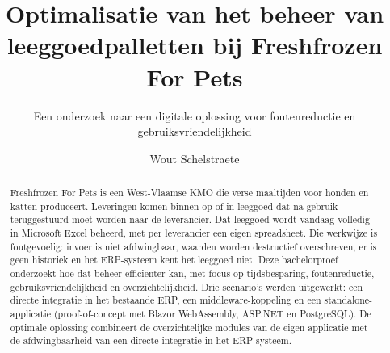 \documentclass[a0,portrait]{hogent-poster}
\title{Optimalisatie van het beheer van leeggoedpalletten bij Freshfrozen For Pets}
\subtitle{Een onderzoek naar een digitale oplossing voor foutenreductie en gebruiksvriendelijkheid}
\author{Wout Schelstraete}
\begin{document}
\maketitle

\begin{abstract}
Freshfrozen For Pets is een West-Vlaamse KMO die verse maaltijden voor honden en katten produceert. Leveringen komen binnen op of in leeggoed dat na gebruik teruggestuurd moet worden naar de leverancier. Dat leeggoed wordt vandaag volledig in Microsoft Excel beheerd, met per leverancier een eigen spreadsheet. Die werkwijze is foutgevoelig: invoer is niet afdwingbaar, waarden worden destructief overschreven, er is geen historiek en het ERP-systeem kent het leeggoed niet. Deze bachelorproef onderzoekt hoe dat beheer efficiënter kan, met focus op tijdsbesparing, foutenreductie, gebruiksvriendelijkheid en overzichtelijkheid. Drie scenario's werden uitgewerkt: een directe integratie in het bestaande ERP, een middleware-koppeling en een standalone-applicatie (proof-of-concept met Blazor WebAssembly, ASP.NET en PostgreSQL). De optimale oplossing combineert de overzichtelijke modules van de eigen applicatie met de afdwingbaarheid van een directe integratie in het ERP-systeem.
\end{abstract}
\end{document}
